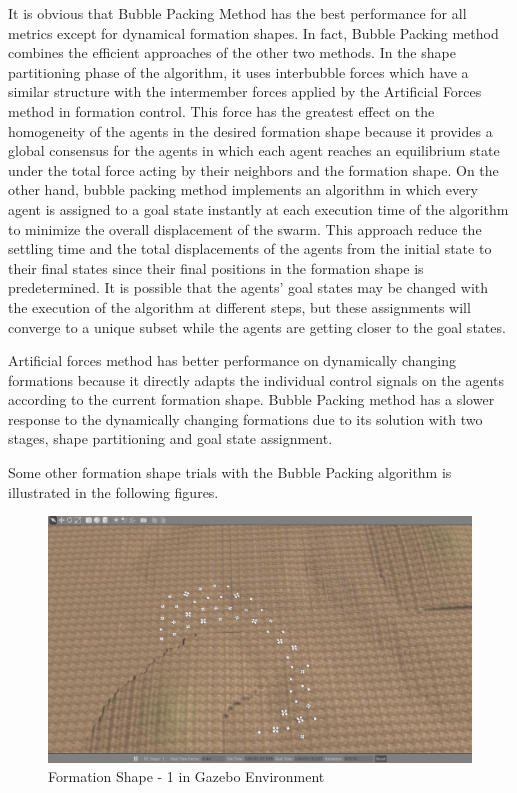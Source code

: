 It is obvious that Bubble Packing Method has the best performance for all metrics except for dynamical formation shapes. In fact, Bubble Packing method combines the efficient approaches of the other two methods. In the shape partitioning phase of the algorithm, it uses interbubble forces which have a similar structure with the intermember forces applied by the Artificial Forces method in formation control. This force has the greatest  effect on the homogeneity of the agents in the desired formation shape because it provides a global consensus for the agents in which each agent reaches an equilibrium state under the total force acting by their neighbors and the formation shape. On the other hand, bubble packing method implements an algorithm in which every agent is assigned to a goal state instantly at each execution time of the algorithm to minimize the overall displacement of the swarm. This approach reduce the settling time and the total displacements of the agents from the initial state to their final states since their final positions in the formation shape is predetermined. It is possible that the agents' goal states may be changed with the execution of the algorithm at different steps, but these assignments will converge to a unique subset while the agents are getting closer to the goal states. 

Artificial forces method has better performance on dynamically changing formations because it directly adapts the individual control signals on the agents according to the current formation shape. Bubble Packing method has a slower response to the dynamically changing formations due to its solution with two stages, shape partitioning and goal state assignment. 
		
Some other formation shape trials with the Bubble Packing algorithm is illustrated in the following figures.

\begin{figure}[H]
\caption{Formation Shape - 1 in Gazebo Environment}
\centerline{\includegraphics[scale = 0.32]{1_Gazebo}}
\end{figure} 
			
